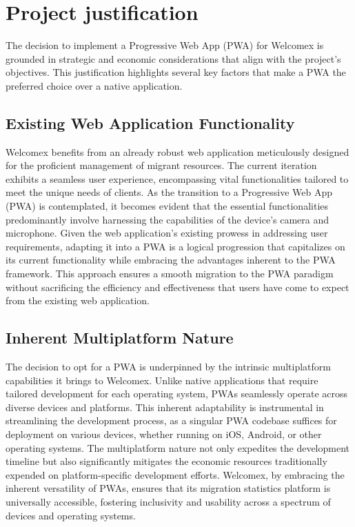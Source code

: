 \documentclass[conference]{IEEEtran}
\begin{document}
\section{Project justification}
The decision to implement a Progressive Web App (PWA) for Welcomex is grounded in strategic and economic considerations that align with the project's objectives. This justification highlights several key factors that make a PWA the preferred choice over a native application.
\subsection{Existing Web Application Functionality}
Welcomex benefits from an already robust web application meticulously designed for the proficient management of migrant resources. The current iteration exhibits a seamless user experience, encompassing vital functionalities tailored to meet the unique needs of clients. As the transition to a Progressive Web App (PWA) is contemplated, it becomes evident that the essential functionalities predominantly involve harnessing the capabilities of the device's camera and microphone. Given the web application's existing prowess in addressing user requirements, adapting it into a PWA is a logical progression that capitalizes on its current functionality while embracing the advantages inherent to the PWA framework. This approach ensures a smooth migration to the PWA paradigm without sacrificing the efficiency and effectiveness that users have come to expect from the existing web application.
\subsection{Inherent Multiplatform Nature}
The decision to opt for a PWA is underpinned by the intrinsic multiplatform capabilities it brings to Welcomex. Unlike native applications that require tailored development for each operating system, PWAs seamlessly operate across diverse devices and platforms. This inherent adaptability is instrumental in streamlining the development process, as a singular PWA codebase suffices for deployment on various devices, whether running on iOS, Android, or other operating systems. The multiplatform nature not only expedites the development timeline but also significantly mitigates the economic resources traditionally expended on platform-specific development efforts. Welcomex, by embracing the inherent versatility of PWAs, ensures that its migration statistics platform is universally accessible, fostering inclusivity and usability across a spectrum of devices and operating systems.
\end{document}
